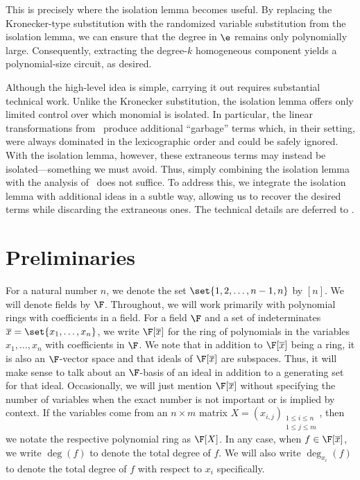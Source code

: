 \documentclass[letterpaper, 11pt]{amsart}
\begin{document}
This is precisely where the isolation lemma becomes useful.
By replacing the Kronecker-type substitution with the randomized variable substitution from the isolation lemma, we can ensure that the degree in $\e$ remains only polynomially large.
Consequently, extracting the degree-$k$ homogeneous component yields a polynomial-size circuit, as desired.

Although the high-level idea is simple, carrying it out requires substantial technical work.
Unlike the Kronecker substitution, the isolation lemma offers only limited control over which monomial is isolated.
In particular, the linear transformations from~\cite{AF21} produce additional ``garbage'' terms which, in their setting, were always dominated in the lexicographic order and could be safely ignored.
With the isolation lemma, however, these extraneous terms may instead be isolated—something we must avoid.
Thus, simply combining the isolation lemma with the analysis of~\cite{AF21} does not suffice.
To address this, we integrate the isolation lemma with additional ideas in a subtle way, allowing us to recover the desired terms while discarding the extraneous ones.
The technical details are deferred to .

\section{Preliminaries}\label{sec:prelims}

For a natural number $n$, we denote the set $\set{1, 2, \ldots, n - 1, n}$ by $[n]$.
We will denote fields by $\F$.
Throughout, we will work primarily with polynomial rings with coefficients in a field.
For a field $\F$ and a set of indeterminates $\overline{x} = \set{x_1, \ldots, x_n}$, we write $\F[\overline{x}]$ for the ring of polynomials in the variables $x_1, \ldots, x_n$ with coefficients in $\F$.
We note that in addition to $\F[\overline{x}]$ being a ring, it is also an $\F$-vector space and that ideals of $\F[\overline{x}]$ are subspaces.
Thus, it will make sense to talk about an $\F$-basis of an ideal in addition to a generating set for that ideal.
Occasionally, we will just mention $\F[\overline{x}]$ without specifying the number of variables when the exact number is not important or is implied by context.
If the variables come from an $n \times m$ matrix $X = (x_{i, j})_{\substack{1 \leq i \leq n \\ 1 \leq j \leq m}}$, then we notate the respective polynomial ring as $\F[X]$.
In any case, when $f \in \F[\overline{x}]$, we write $\deg(f)$ to denote the total degree of $f$.
We will also write $\deg_{x_{i}}(f)$ to denote the total degree of $f$ with respect to $x_{i}$ specifically.
\end{document}

